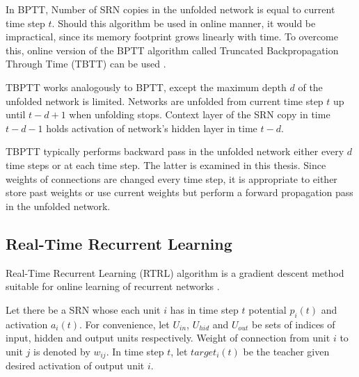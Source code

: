 \documentclass[12pt,oneside]{fithesis2}
\begin{document}
In BPTT, Number of SRN copies in the unfolded network is equal to current time step $t$. Should this algorithm be used in online manner, it would be impractical, since its memory footprint grows linearly with time. To overcome this, online version of the BPTT algorithm called Truncated Backpropagation Through Time (TBTT) can be used  \cite{Williams90anefficient}. \par
TBPTT works analogously to BPTT, except the maximum depth $d$ of the unfolded network is limited. Networks are unfolded from current time step $t$ up until $t-d+1$ when unfolding stops. Context layer of the SRN copy in time $t-d-1$ holds activation of network's hidden layer in time $t-d$.\par
TBPTT typically performs backward pass in the unfolded network either every $d$ time steps or at each time step. The latter is examined in this thesis. Since weights of connections are changed every time step, it is appropriate to either store past weights or use current weights but perform a forward propagation pass in the unfolded network.

\subsection{Real-Time Recurrent Learning}
Real-Time Recurrent Learning (RTRL) algorithm is a gradient descent method suitable for online learning of recurrent networks \cite{williams-zipser}.\par

Let there be a SRN whose each unit $i$ has in time step $t$ potential $p_i(t)$ and activation $a_i(t)$. For convenience, let $U_{in}$, $U_{hid}$ and $U_{out}$ be sets of indices of input, hidden and output units respectively. Weight of connection from unit $i$ to unit $j$ is denoted by $w_{ij}$. In time step $t$, let $target_i(t)$ be the teacher given desired activation of output unit $i$.\par
\end{document}
